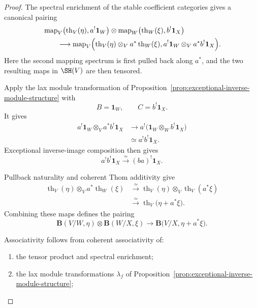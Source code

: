 \begin{proof}
The spectral enrichment of the stable coefficient categories gives a
canonical pairing
\[
\begin{aligned}
    &
    \operatorname{map}_V
    \bigl(
      \operatorname{th}_V(\eta),
      a^!\mathbf1_W
    \bigr)
    \otimes
    \operatorname{map}_W
    \bigl(
      \operatorname{th}_W(\xi),
      b^!\mathbf1_X
    \bigr)
    \\
    &\qquad\longrightarrow
    \operatorname{map}_V
    \Bigl(
      \operatorname{th}_V(\eta)
      \otimes_V
      a^*\operatorname{th}_W(\xi),
      a^!\mathbf1_W
      \otimes_V
      a^*b^!\mathbf1_X
    \Bigr).
\end{aligned}
\]
Here the second mapping spectrum is first pulled back along \(a^*\), and
the two resulting maps in \(\SH(V)\) are then tensored.

Apply the lax module transformation of
Proposition~\ref{prop:exceptional-inverse-module-structure}
with
\[
    B=\mathbf1_W,
    \qquad
    C=b^!\mathbf1_X.
\]
It gives
\[
\begin{aligned}
    a^!\mathbf1_W
    \otimes_V
    a^*b^!\mathbf1_X
    &\longrightarrow
    a^!
    \bigl(
      \mathbf1_W\otimes_Wb^!\mathbf1_X
    \bigr) \\
    &\simeq
    a^!b^!\mathbf1_X.
\end{aligned}
\]
Exceptional inverse-image composition then gives
\[
    a^!b^!\mathbf1_X
    \xrightarrow{\simeq}
    (ba)^!\mathbf1_X.
\]

Pullback naturality and coherent Thom additivity give
\[
\begin{aligned}
    \operatorname{th}_V(\eta)
    \otimes_V
    a^*\operatorname{th}_W(\xi)
    &\xrightarrow{\simeq}
    \operatorname{th}_V(\eta)
    \otimes_V
    \operatorname{th}_V(a^*\xi) \\
    &\xrightarrow{\simeq}
    \operatorname{th}_V
    \bigl(
      \eta+a^*\xi
    \bigr).
\end{aligned}
\]
Combining these maps defines the pairing
\[
    \mathbf B(V/W,\eta)
    \otimes
    \mathbf B(W/X,\xi)
    \longrightarrow
    \mathbf B
    \bigl(
      V/X,
      \eta+a^*\xi
    \bigr).
\]

Associativity follows from coherent associativity of:

\begin{enumerate}
    \item the tensor product and spectral enrichment;

    \item the lax module transformations
    \(\lambda_f\) of
    Proposition~\ref{prop:exceptional-inverse-module-structure};


\end{enumerate}
\end{proof}
